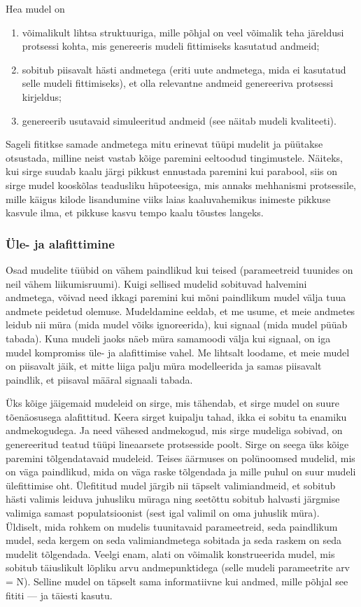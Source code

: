 \documentclass[]{book}
\begin{document}
Hea mudel on

\begin{enumerate}
\def\labelenumi{(\arabic{enumi})}
\item
  võimalikult lihtsa struktuuriga, mille põhjal on veel võimalik teha
  järeldusi protsessi kohta, mis genereeris mudeli fittimiseks kasutatud
  andmeid;
\item
  sobitub piisavalt hästi andmetega (eriti uute andmetega, mida ei
  kasutatud selle mudeli fittimiseks), et olla relevantne andmeid
  genereeriva protsessi kirjeldus;
\item
  genereerib usutavaid simuleeritud andmeid (see näitab mudeli
  kvaliteeti).
\end{enumerate}

Sageli fititkse samade andmetega mitu erinevat tüüpi mudelit ja püütakse
otsustada, milline neist vastab kõige paremini eeltoodud tingimustele.
Näiteks, kui sirge suudab kaalu järgi pikkust ennustada paremini kui
parabool, siis on sirge mudel kooskõlas teadusliku hüpoteesiga, mis
annaks mehhanismi protsessile, mille käigus kilode lisandumine viiks
laias kaaluvahemikus inimeste pikkuse kasvule ilma, et pikkuse kasvu
tempo kaalu tõustes langeks.

\subsubsection{Üle- ja alafittimine}\label{ule--ja-alafittimine}

Osad mudelite tüübid on vähem paindlikud kui teised (parameetreid
tuunides on neil vähem liikumisruumi). Kuigi sellised mudelid sobituvad
halvemini andmetega, võivad need ikkagi paremini kui mõni paindlikum
mudel välja tuua andmete peidetud olemuse. Mudeldamine eeldab, et me
usume, et meie andmetes leidub nii müra (mida mudel võiks ignoreerida),
kui signaal (mida mudel püüab tabada). Kuna mudeli jaoks näeb müra
samamoodi välja kui signaal, on iga mudel kompromiss üle- ja
alafittimise vahel. Me lihtsalt loodame, et meie mudel on piisavalt
jäik, et mitte liiga palju müra modelleerida ja samas piisavalt
paindlik, et piisaval määral signaali tabada.

Üks kõige jäigemaid mudeleid on sirge, mis tähendab, et sirge mudel on
suure tõenäosusega alafittitud. Keera sirget kuipalju tahad, ikka ei
sobitu ta enamiku andmekogudega. Ja need vähesed andmekogud, mis sirge
mudeliga sobivad, on genereeritud teatud tüüpi lineaarsete protsesside
poolt. Sirge on seega üks kõige paremini tõlgendatavaid mudeleid. Teises
äärmuses on polünoomsed mudelid, mis on väga paindlikud, mida on väga
raske tõlgendada ja mille puhul on suur mudeli ülefittimise oht.
Ülefititud mudel järgib nii täpselt valimiandmeid, et sobitub hästi
valimis leiduva juhusliku müraga ning seetõttu sobitub halvasti järgmise
valimiga samast populatsioonist (sest igal valimil on oma juhuslik
müra). Üldiselt, mida rohkem on mudelis tuunitavaid parameetreid, seda
paindlikum mudel, seda kergem on seda valimiandmetega sobitada ja seda
raskem on seda mudelit tõlgendada. Veelgi enam, alati on võimalik
konstrueerida mudel, mis sobitub täiuslikult lõpliku arvu
andmepunktidega (selle mudeli parameetrite arv = N). Selline mudel on
täpselt sama informatiivne kui andmed, mille põhjal see fititi --- ja
täiesti kasutu.
\end{document}
